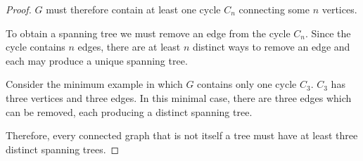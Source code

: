 \documentclass[11pt, letterpaper, includehead]{article}
\theoremstyle{plain}
\theoremstyle{mydefinition}
\theoremstyle{myproperty}
\begin{document}
\begin{enumerate}[label=\textbf{\arabic*}., leftmargin=*]
\begin{proof}
        $G$ must therefore contain at least one cycle $C_n$ connecting some $n$ vertices.  

        To obtain a spanning tree we must remove an edge from the cycle $C_n$. Since the cycle contains $n$ edges, there are at least $n$ distinct ways to remove an edge and each may produce a unique spanning tree.

        Consider the minimum example in which $G$ contains only one cycle $C_3$. $C_3$ has three vertices and three edges. In this minimal case, there are three edges which can be removed, each producing a distinct spanning tree. 

        Therefore, every connected graph that is not itself a tree must have at least three distinct spanning trees.
    \end{proof}

\end{enumerate}
\end{document}
